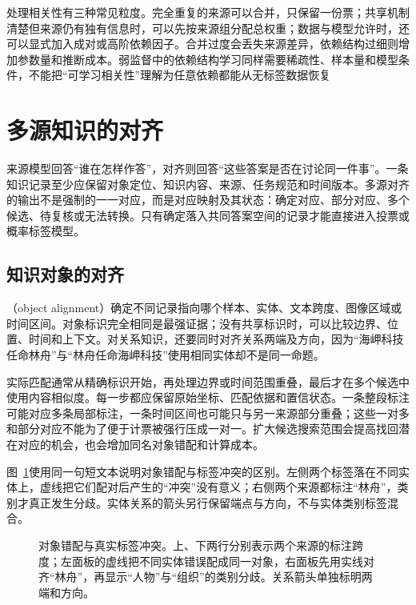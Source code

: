 处理相关性有三种常见粒度。完全重复的来源可以合并，只保留一份票；共享机制清楚但来源仍有独有信息时，可以先按来源组分配总权重；数据与模型允许时，还可以显式加入成对或高阶依赖因子。合并过度会丢失来源差异，依赖结构过细则增加参数量和推断成本。弱监督中的依赖结构学习同样需要稀疏性、样本量和模型条件，不能把“可学习相关性”理解为任意依赖都能从无标签数据恢复

\section{多源知识的对齐}
\label{sec:knowledge-fusion-alignment}

来源模型回答“谁在怎样作答”，对齐则回答“这些答案是否在讨论同一件事”。一条知识记录至少应保留对象定位、知识内容、来源、任务规范和时间版本。多源对齐的输出不是强制的一一对应，而是对应映射及其状态：确定对应、部分对应、多个候选、待复核或无法转换。只有确定落入共同答案空间的记录才能直接进入投票或概率标签模型。

\subsection{知识对象的对齐}
\label{sec:knowledge-fusion-object-alignment}

（object alignment）确定不同记录指向哪个样本、实体、文本跨度、图像区域或时间区间。对象标识完全相同是最强证据；没有共享标识时，可以比较边界、位置、时间和上下文。对关系知识，还要同时对齐关系两端及方向，因为“海岬科技任命林舟”与“林舟任命海岬科技”使用相同实体却不是同一命题。

实际匹配通常从精确标识开始，再处理边界或时间范围重叠，最后才在多个候选中使用内容相似度。每一步都应保留原始坐标、匹配依据和置信状态。一条整段标注可能对应多条局部标注，一条时间区间也可能只与另一来源部分重叠；这些一对多和部分对应不能为了便于计票被强行压成一对一。扩大候选搜索范围会提高找回潜在对应的机会，也会增加同名对象错配和计算成本。

图~\ref{fig:knowledge-fusion-object-alignment}使用同一句短文本说明对象错配与标签冲突的区别。左侧两个标签落在不同实体上，虚线把它们配对后产生的“冲突”没有意义；右侧两个来源都标注“林舟”，类别才真正发生分歧。实体关系的箭头另行保留端点与方向，不与实体类别标签混合。

\begin{figure}[htbp]
  \centering
  
  \caption{对象错配与真实标签冲突。上、下两行分别表示两个来源的标注跨度；左面板的虚线把不同实体错误配成同一对象，右面板先用实线对齐“林舟”，再显示“人物”与“组织”的类别分歧。关系箭头单独标明两端和方向。}
  \label{fig:knowledge-fusion-object-alignment}
\end{figure}
\FloatBarrier

